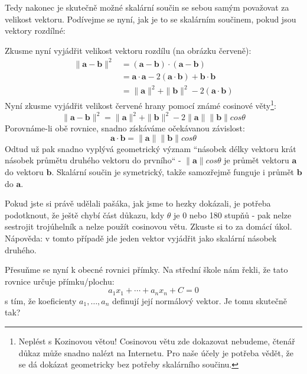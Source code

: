 \documentclass[a5paper,12pt]{amsbook}
\theoremstyle{definition}
\newcommand{\myvec}[1]{\mathbf{#1}}
\begin{document}
Tedy nakonec je skutečně možné skalární součin se sebou samým považovat za velikost vektoru. Podívejme
se nyní, jak je to se skalárním součinem, pokud jsou vektory rozdílné:
\begin{center}

\end{center}
Zkusme nyní vyjádřit velikost vektoru rozdílu (na obrázku červeně):
\begin{equation*}
\begin{split}
\|\myvec{a}-\myvec{b}\|^2 &= (\myvec{a}-\myvec{b})\cdot(\myvec{a}-\myvec{b}) \\
  &= \myvec{a}\cdot\myvec{a} - 2(\myvec{a}\cdot\myvec{b}) + \myvec{b}\cdot\myvec{b} \\
  &= \|\myvec{a}\|^2 + \|\myvec{b}\|^2 - 2(\myvec{a}\cdot\myvec{b})
\end{split}
\end{equation*}
Nyní zkusme vyjádřit velikost červené hrany pomocí známé cosinové věty\footnote{
  Neplést s Kozinovou větou! Cosinovou větu zde dokazovat nebudeme, čtenář důkaz může snadno nalézt
  na Internetu. Pro naše účely je potřeba vědět, že se dá dokázat geometricky bez potřeby skalárního
  součinu.
}:
\begin{equation*}
\|\myvec{a}-\myvec{b}\|^2 = \|\myvec{a}\|^2 + \|\myvec{b}\|^2 - 2\|\myvec{a}\|\|\myvec{b}\|cos\theta
\end{equation*}
Porovnáme-li obě rovnice, snadno získáváme očekávanou závislost:
\begin{equation*}
\myvec{a}\cdot\myvec{b} = \|\myvec{a}\|\|\myvec{b}\|cos\theta
\end{equation*}
Odtud už pak snadno vyplývá geometrický význam ``násobek délky vektoru krát násobek průmětu druhého
vektoru do prvního`` - $\|\myvec{a}\|cos\theta$ je průmět vektoru $\myvec{a}$ do vektoru $\myvec{b}$.
Skalární součin je symetrický, takže samozřejmě funguje i průmět $\myvec{b}$ do $\myvec{a}$.

Pokud jste si právě udělali pašáka, jak jsme to hezky dokázali, je potřeba podotknout, že ještě chybí
část důkazu, kdy $\theta$ je 0 nebo 180 stupňů - pak nelze sestrojit trojúhelník a nelze použít
cosinovou větu. Zkuste si to za domácí úkol. Nápověda: v tomto případě jde jeden vektor vyjádřit
jako skalární násobek druhého.

\medskip\noindent
Přesuňme se nyní k obecné rovnici přímky. Na střední škole nám řekli, že tato rovnice určuje
přímku/plochu:
\begin{equation*}
a_1x_1 + \cdots + a_nx_n + C = 0
\end{equation*}
s tím, že koeficienty $a_1, \ldots, a_n$ definují její normálový vektor. Je tomu skutečně tak?
\end{document}

